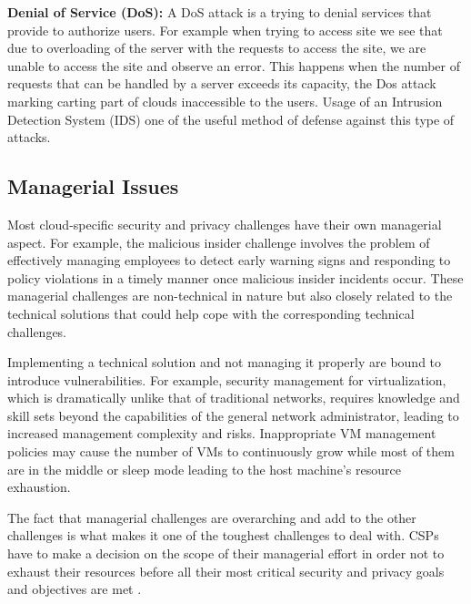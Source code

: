 \documentclass[twocolumn]{article}
\begin{document}
 
\textbf{Denial of Service (DoS):} A DoS attack is a trying to denial services that provide to authorize users. For example when trying to access site we see that due to overloading of the server with the requests to access the site, we are unable to access the site and observe an error. This happens when the number of requests that can be handled by a server exceeds its capacity, the Dos attack marking carting part of clouds inaccessible to the users. Usage of an Intrusion Detection System (IDS) one of the useful method of defense against this type of attacks.






    \subsection{Managerial Issues}
Most cloud-specific security and privacy challenges have their own managerial aspect. For example, the malicious insider challenge involves the problem of effectively managing employees to detect early warning signs and responding to policy violations in a timely manner once malicious insider incidents occur. These managerial challenges are non-technical in nature but also closely related to the technical solutions that could help cope with the corresponding technical challenges. 









Implementing a technical solution and not managing it properly are bound to introduce vulnerabilities. For example, security management for virtualization, which is dramatically unlike that of traditional networks, requires knowledge and skill sets beyond the capabilities of the general network administrator, leading to increased management complexity and risks. Inappropriate VM management policies may cause the number of VMs to continuously grow while most of them are in the middle or sleep mode leading  to the host machine’s resource exhaustion.









The fact that managerial challenges are overarching and add to the other challenges is what makes it one of the toughest challenges to deal with. CSPs have to make a decision on the scope of their managerial effort in order not to exhaust their resources before all their most critical security and privacy goals and objectives are met \cite{liu2015survey}.
\end{document}
